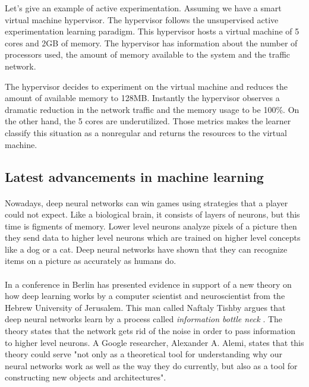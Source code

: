 \begin{description}
	Let's give an example of active experimentation. Assuming we have a smart virtual machine hypervisor. The hypervisor follows the unsupervised active experimentation learning paradigm. This hypervisor hosts a virtual machine of 5 cores and 2GB of memory. The hypervisor has information about the number of processors used, the amount of memory available to the system and the traffic network.
	
	The hypervisor decides to experiment on the virtual machine and reduces the amount of available memory to 128MB. Instantly the hypervisor observes a dramatic reduction in the network traffic and the memory usage to be 100\%. On the other hand, the 5 cores are underutilized. Those metrics makes the learner classify this situation as a nonregular and returns the resources to the virtual machine.
	
\end{description}

\subsection{Latest advancements in machine learning}
\paragraph{}Nowadays, deep neural networks can win games using strategies that a player could not expect. Like a biological brain, it consists of layers of neurons, but this time is figments of memory. Lower level neurons analyze pixels of a picture then they send data to higher level neurons which are trained on higher level concepts like a dog or a cat. Deep neural networks have shown that they can recognize items on a picture as accurately as humans do.

\paragraph{} In a conference in Berlin has presented evidence in support of a new theory on how deep learning works by a computer scientist and neuroscientist from the Hebrew University of Jerusalem. This man called Naftaly Tishby argues that deep neural networks learn by a process called \textit{information bottle neck} \cite{tishby2000information}. The theory states that the network gets rid of the noise in order to pass information to higher level neurons. A Google researcher, Alexander A. Alemi, states that this theory could serve "not only as a theoretical tool for understanding why our neural networks work as well as the way they do currently, but also as a tool for constructing new objects and architectures".

